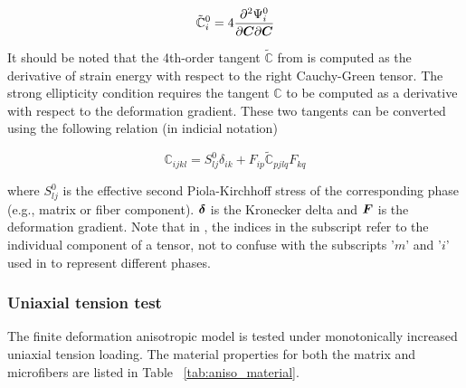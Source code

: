 \documentclass[12pt]{article}
\numberwithin{equation}{section}
\begin{document}
\begin{equation}\label{eq:aniso_tangent2}
  \tilde{\mathbb{C}}_i^0 =  
    4 \frac{\partial ^2 \Psi_i^0}{\partial{\boldsymbol{C}} \partial{\boldsymbol{C}}}
\end{equation}

It should be noted that the 4th-order tangent $\tilde{\mathbb{C}}$ 
from  is computed as the derivative of strain 
energy with respect to the right Cauchy-Green tensor. The strong 
ellipticity condition  requires the 
tangent $\mathbb{C}$ to be computed as a derivative with respect to 
the deformation gradient. These two tangents can be converted using 
the following relation (in indicial notation)

\begin{equation}\label{eq:aniso_tangent3}
  \mathbb{C}_{ijkl} = S_{lj}^0\delta_{ik}
    + F_{ip} \tilde{\mathbb{C}}_{pjlq} F_{kq}
\end{equation}

where $S_{lj}^0$ is the effective second Piola-Kirchhoff stress of the corresponding phase (e.g., matrix or fiber component). ${\boldsymbol{\delta}}$ is the 
Kronecker delta and ${\boldsymbol{F}}$ is the deformation gradient. Note that in , the indices in the subscript refer to the individual component of a tensor, not to confuse with the subscripts '$m$' and '$i$' used in  to represent different phases.

\subsubsection{Uniaxial tension test}

The finite deformation anisotropic model is tested under monotonically
increased uniaxial tension loading. The material properties for both 
the matrix and microfibers are listed in Table~
\ref{tab:aniso_material}.
\end{document}
